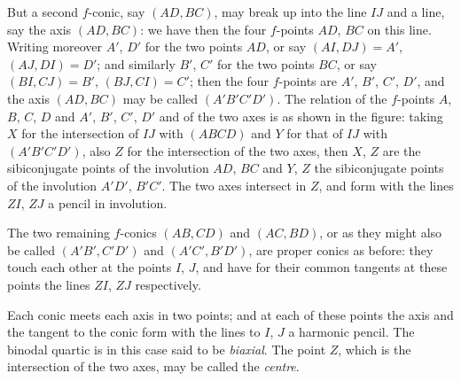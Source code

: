 \documentclass[11pt,a4paper]{article}
\begin{document}
But a second $f$-conic, say $(AD, BC)$, may break up into the line $IJ$ and a line, say the axis $(AD, BC)$: we have then the four $f$-points $AD$, $BC$ on this line. Writing moreover $A'$, $D'$ for the two points $AD$, or say $(AI, DJ) = A'$, $(AJ, DI) = D'$; and similarly $B'$, $C'$ for the two points $BC$, or say $(BI, CJ) = B'$, $(BJ, CI) = C'$; then the four $f$-points are $A'$, $B'$, $C'$, $D'$, and the axis $(AD, BC)$ may be called $(A'B'C'D')$. The relation of the $f$-points $A$, $B$, $C$, $D$ and $A'$, $B'$, $C'$, $D'$ and of the two axes is as shown in the figure: taking $X$ for the intersection of $IJ$ with $(ABCD)$ and $Y$ for that of $IJ$ with $(A'B'C'D')$, also $Z$ for the intersection of the two axes, then $X$, $Z$ are the sibiconjugate points of the involution $AD$, $BC$ and $Y$, $Z$ the sibiconjugate points of the involution $A'D'$, $B'C'$. The two axes intersect in $Z$, and form with the lines $ZI$, $ZJ$ a pencil in involution.

The two remaining $f$-conics $(AB, CD)$ and $(AC, BD)$, or as they might also be called $(A'B', C'D')$ and $(A'C', B'D')$, are proper conics as before: they touch each other at the points $I$, $J$, and have for their common tangents at these points the lines $ZI$, $ZJ$ respectively.


Each conic meets each axis in two points; and at each of these points the axis and the tangent to the conic form with the lines to $I$, $J$ a harmonic pencil. The binodal quartic is in this case said to be \emph{biaxial}. The point $Z$, which is the intersection of the two axes, may be called the \emph{centre}.
\end{document}
